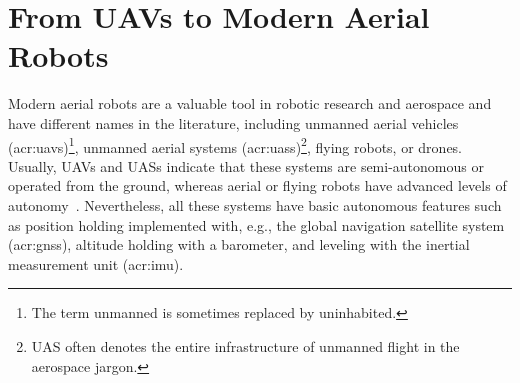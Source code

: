 

\section{From UAVs to Modern Aerial Robots}
\label{sec:history}

Modern aerial robots are a valuable tool in robotic research and aerospace and have different names in the literature, including unmanned aerial vehicles (\Gls{acr:uav}s)\footnote{The term unmanned is sometimes replaced by uninhabited.}, unmanned aerial systems (\Gls{acr:uas}s)\footnote{UAS often denotes the entire infrastructure of unmanned flight in the aerospace jargon.}, flying robots, or drones. Usually, UAVs and UASs indicate that these systems are semi-autonomous or operated from the ground, whereas aerial or flying robots have advanced levels of autonomy~\citep{siciliano2016springer}. Nevertheless, all these systems have basic autonomous features such as position holding implemented with, e.g., the global navigation satellite system (\Gls{acr:gnss}), altitude holding with a barometer, and leveling with the inertial measurement unit (\Gls{acr:imu}).

